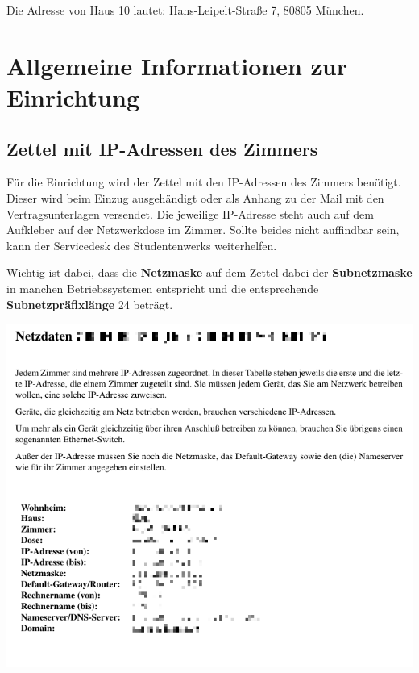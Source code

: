 \documentclass[a4paper,12pt]{scrartcl}
\begin{document}
Die Adresse von Haus 10 lautet: Hans-Leipelt-Straße 7, 80805 München.

\section{Allgemeine Informationen zur Einrichtung}
\label{sec:general}

\subsection{Zettel mit IP-Adressen des Zimmers}
\label{ip_sheet}
\begin{minipage}{0.57\textwidth}
Für die Einrichtung wird der Zettel mit den IP-Adressen des Zimmers benötigt.
Dieser wird beim Einzug ausgehändigt oder als Anhang zu der Mail mit den Vertragsunterlagen versendet.
Die jeweilige IP-Adresse steht auch auf dem Aufkleber auf der Netzwerkdose im Zimmer.
Sollte beides nicht auffindbar sein, kann der Servicedesk des Studentenwerks weiterhelfen.

Wichtig ist dabei, dass die \textbf{Netzmaske} auf dem Zettel dabei der \textbf{Subnetzmaske} in manchen Betriebssystemen entspricht und die entsprechende \textbf{Subnetzpräfixlänge} 24 beträgt.
\end{minipage}
\hfill
\begin{minipage}{0.4\textwidth}
\includegraphics[width=\linewidth]{Bilder/ip_zettel}
\end{minipage}
\end{document}
